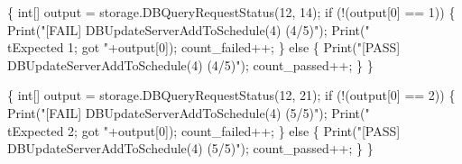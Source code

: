 \documentclass{article}
\def\nwendcode{\endtrivlist \endgroup}
\let\nwdocspar=\par
\theoremstyle{definition}
\begin{document}
\{
  int[] output = storage.DBQueryRequestStatus(12, 14);
  if (!(output[0] == 1)) \{
    Print("[FAIL] DBUpdateServerAddToSchedule(4) (4/5)");
    Print("\\tExpected 1; got "+output[0]);
    count_failed++;
  \} else \{
    Print("[PASS] DBUpdateServerAddToSchedule(4) (4/5)");
    count_passed++;
  \}
\}
\nwendcode{}\nwdocspar
\nwenddocs{}\endmoddef{}
\{
  int[] output = storage.DBQueryRequestStatus(12, 21);
  if (!(output[0] == 2)) \{
    Print("[FAIL] DBUpdateServerAddToSchedule(4) (5/5)");
    Print("\\tExpected 2; got "+output[0]);
    count_failed++;
  \} else \{
    Print("[PASS] DBUpdateServerAddToSchedule(4) (5/5)");
    count_passed++;
  \}
\}
\nwendcode{}\nwdocspar
\end{document}
